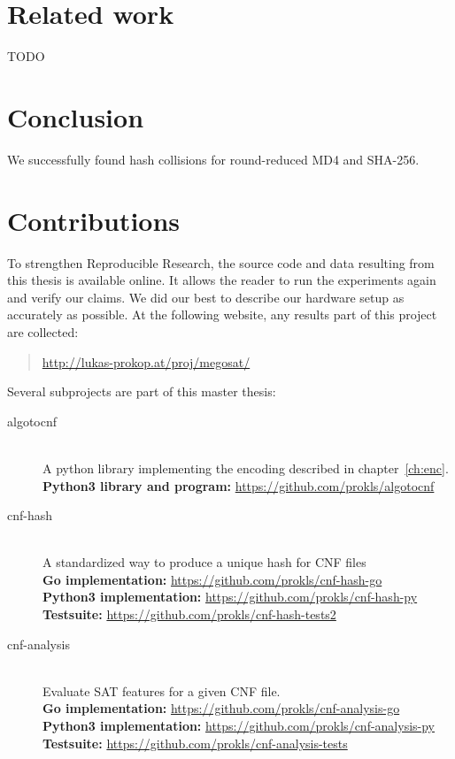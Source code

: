 \section{Related work}
\label{sec:results-related}

TODO

\section{Conclusion}
\label{sec:conclusion}

We successfully found hash collisions for round-reduced MD4 and SHA-256.

\section{Contributions}
\label{sec:contributions}
%
To strengthen Reproducible Research, the source code and data resulting from this thesis is available online.
It allows the reader to run the experiments again and verify our claims.
We did our best to describe our hardware setup as accurately as possible.
At the following website, any results part of this project are collected:

\begin{quote}
  \url{http://lukas-prokop.at/proj/megosat/}
\end{quote}

Several subprojects are part of this master thesis:
\begin{description}
\item[algotocnf]\hfill{} \\
  A python library implementing the encoding described in chapter~\ref{ch:enc}. \\[4pt]
  \textbf{Python3 library and program:} \url{https://github.com/prokls/algotocnf}
\item[cnf-hash]\hfill{} \\
  A standardized way to produce a unique hash for CNF files \\[4pt]
  \textbf{Go implementation:} \url{https://github.com/prokls/cnf-hash-go} \\
  \textbf{Python3 implementation:} \url{https://github.com/prokls/cnf-hash-py} \\
  \textbf{Testsuite:} \url{https://github.com/prokls/cnf-hash-tests2}
\item[cnf-analysis]\hfill{} \\
  Evaluate SAT features for a given CNF file. \\[4pt]
  \textbf{Go implementation:} \url{https://github.com/prokls/cnf-analysis-go} \\
  \textbf{Python3 implementation:} \url{https://github.com/prokls/cnf-analysis-py} \\
  \textbf{Testsuite:} \url{https://github.com/prokls/cnf-analysis-tests}
\end{description}
